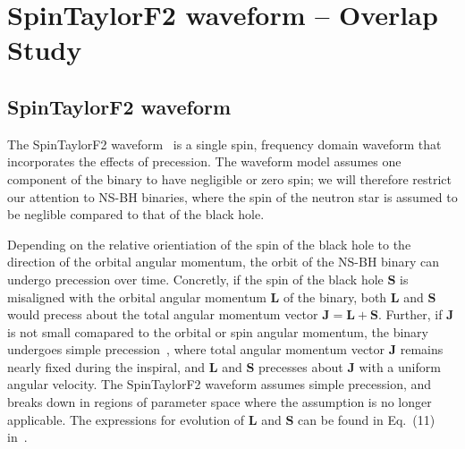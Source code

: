
\chapter{SpinTaylorF2 waveform -- Overlap Study}

\label{chap:SpinTaylorF2 waveform}
\section{SpinTaylorF2 waveform}
The SpinTaylorF2 waveform~\cite{Lundgren2014} is a single spin, frequency domain
waveform that incorporates the effects of precession.  The waveform model
assumes one component of the binary to have negligible or zero spin; we will
therefore restrict our attention to NS-BH binaries, where the spin of the
neutron star is assumed to be neglible compared to that of the black hole.

Depending on the relative orientiation of the spin of the black hole to the
direction of the orbital angular momentum, the orbit of the NS-BH binary can
undergo precession over time. Concretly, if the spin of the black hole
$\mathbf{S}$ is misaligned with the orbital angular momentum $\mathbf{L}$ of the
binary, both $\mathbf{L}$ and $\mathbf{S}$ would precess about the total angular
momentum vector $\mathbf{J} = \mathbf{L} + \mathbf{S}$. Further, if $\mathbf{J}$
is not  small comapared to the orbital or spin angular momentum, the binary
undergoes simple precession~\cite{Apostolatos1994}, where total angular momentum
vector $\mathbf{J}$ remains nearly fixed during the inspiral, and $\mathbf{L}$
and $\mathbf{S}$ precesses about $\mathbf{J}$ with a uniform angular velocity. 
The SpinTaylorF2 waveform assumes simple precession, and breaks down in regions of 
parameter space where the assumption is no longer applicable. The expressions for 
evolution of $\mathbf{L}$ and $\mathbf{S}$ can be found in Eq.~(11) in~\cite{Apostolatos1994}.

